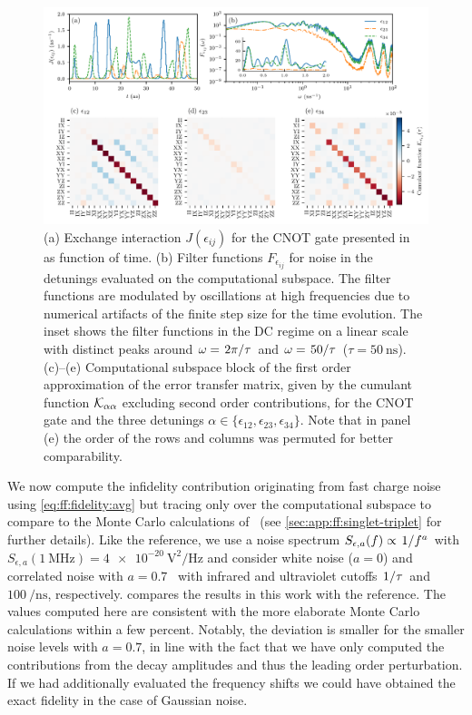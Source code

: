 \begin{figure}[tbp]
    \centering
    \includegraphics[width=\textwidth]{img/pdf/all_in_one_alpha-0-7_linear_complete_CNOT}
    \caption{
        (a) Exchange interaction $J(\epsilon_{ij})$ for the CNOT gate presented in~ as function of time.
        (b) Filter functions $F_{\epsilon_{ij}}$ for noise in the detunings evaluated on the computational subspace.
        The filter functions are modulated by oscillations at high frequencies due to numerical artifacts of the finite step size for the time evolution.
        The inset shows the filter functions in the DC regime on a linear scale with distinct peaks around $\omega = \flatfrac{2\pi}{\tau}$ and $\omega = \flatfrac{50}{\tau}$ ($\tau = \qty{50}{\nano\second}$).
        (c)--(e) Computational subspace block of the first order approximation of the error transfer matrix, given by the cumulant function $\mathcal{K}_{\alpha\alpha}$ excluding second order contributions, for the CNOT gate and the three detunings $\alpha\in\lbrace\epsilon_{12},\epsilon_{23},\epsilon_{34}\rbrace$.
        Note that in panel (e) the order of the rows and columns was permuted for better comparability.
    }
    \label{fig:ff:CNOT}
\end{figure}

We now compute the infidelity contribution originating from fast charge noise using \cref{eq:ff:fidelity:avg} but tracing only over the computational subspace to compare to the Monte Carlo calculations of~ (see \cref{sec:app:ff:singlet-triplet} for further details).
Like the reference, we use a noise spectrum $S_{\epsilon,a}(f)\propto \flatfrac{1}{f^a}$ with $S_{\epsilon,a}(\qty{1}{\MHz}) = \qty{4e-20}{\volt\squared\per\Hz}$ and consider white noise ($a = 0$) and correlated noise with $a = 0.7$~\cite{Dial2013} with infrared and ultraviolet cutoffs $\flatfrac{1}{\tau}$ and $\qty{100}{\per\nano\second}$, respectively.
 compares the results in this work with the reference.
The values computed here are consistent with the more elaborate Monte Carlo calculations within a few percent.
Notably, the deviation is smaller for the smaller noise levels with $a = \num{0.7}$, in line with the fact that we have only computed the contributions from the decay amplitudes \decayamps and thus the leading order perturbation.
If we had additionally evaluated the frequency shifts \freqshifts we could have obtained the exact fidelity in the case of Gaussian noise.

